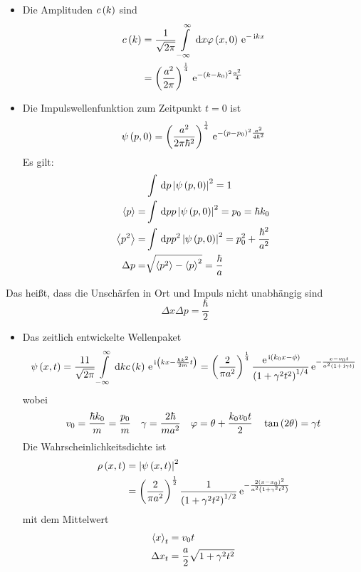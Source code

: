 \begin{figure}[H]
  \centering
  
\end{figure}
\begin{itemize}
  \item Die Amplituden $c\left(k\right)$ sind
  \begin{align}
    c\left(k\right) & = \frac{1}{\sqrt{2\pi}} \int\limits_{-\infty}^{\infty} \,\text d{x} \varphi\left(x,0\right)\, \text{e}^{-\, \text{i} k x} \\
    & = \left( \frac{a^2}{2\pi} \right)^\frac{1}{4} \, \text{e}^{-\left( k-k_0 \right)^2\frac{a^2}{4}}
  \end{align}
  \item Die Impulswellenfunktion zum Zeitpunkt $t = 0$ ist
  \begin{equation}
    \psi\left(p,0\right) = \left( \frac{a^2}{2\pi \hbar^2} \right)^\frac{1}{4} \, \text{e}^{-\left( p-p_0 \right)^2\frac{a^2}{4\hbar^2}}
  \end{equation}
	Es gilt:
	\begin{align}
		& \int \,\text d{p} \left\lvert \psi\left(p,0\right) \right\rvert^2 = 1 \\
		\left\langle p \right\rangle = & \int \,\text d{p} p \left\lvert \psi\left(p,0\right) \right\rvert^2 = p_0 = \hbar k_0 \\
		\left\langle p^2 \right\rangle = & \int \,\text d{p} p^2 \left\lvert \psi\left(p,0\right) \right\rvert^2 = p_0^2 + \frac{\hbar^2}{a^2} \\
		\Delta p = & \sqrt{\left\langle p^2 \right\rangle- \left\langle p \right\rangle^2} = \frac{\hbar}{a}
	\end{align}
\end{itemize}
\begin{figure}[H]
	\centering
	
\end{figure}
Das heißt, dass die Unschärfen in Ort und Impuls nicht unabhängig sind
\begin{equation}
	\Delta x \Delta p = \frac{\hbar}{2}
\end{equation}
\begin{itemize}
	\item Das zeitlich entwickelte Wellenpaket
	\begin{equation}
		\psi\left(x,t\right) = \frac{11}{\sqrt{2\pi}}\int\limits_{-\infty}^{\infty} \,\text d{k} c\left(k\right) \, \text{e}^{\, \text{i}\left( kx - \frac{\hbar k^2}{2 m} t \right)} = \left( \frac{2}{\pi a^2} \right)^\frac14 \frac{\, \text{e}^{\, \text{i}\left( k_0 x - \phi \right)}}{\left( 1 + \gamma^2 t^2 \right)^{1/4}} \, \text{e}^{-\frac{x-v_0 t}{a^2\left( 1 + \, \text{i} \gamma t \right)}}
	\end{equation}
	wobei
	\begin{equation}
		v_0 = \frac{\hbar k_0}{m} = \frac{p_0}{m} \quad \gamma = \frac{2\hbar}{m a^2} \quad \varphi = \theta + \frac{k_0 v_0 t}{2} \quad \tan\left(2\theta\right) = \gamma t
	\end{equation}
	Die Wahrscheinlichkeitsdichte ist
	\begin{align}
		\rho\left(x,t\right) & = \left\lvert \psi\left(x,t\right) \right\rvert^2 \\
		 & = \left( \frac{2}{\pi a^2} \right)^\frac12\frac{1}{\left( 1 + \gamma^2 t^2 \right)^{1/2}}\, \text{e}^{-\frac{2\left( x-x_0 \right)^2}{a^2\left( 1 + \gamma^2 t^2 \right)}}
	\end{align}
	mit dem Mittelwert
	\begin{align}
		\left\langle x \right\rangle_t & = v_0 t \\
		\Delta x_t & = \frac{a}{2}\sqrt{1 +\gamma^2 t^2}
	\end{align}
\end{itemize}
